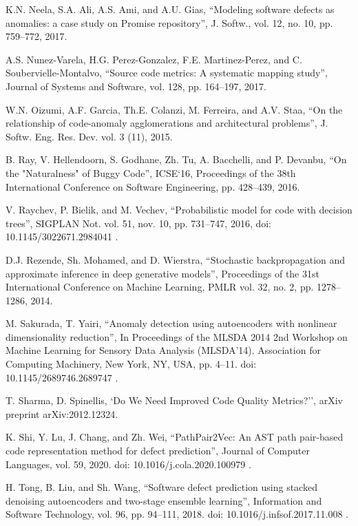 \documentclass[10pt,conference]{IEEEtran}
\begin{document}
\begin{thebibliography}{00}
 K.N. Neela, S.A. Ali, A.S. Ami, and A.U. Gias,
 ``Modeling software defects as anomalies: a case study on Promise repository'',
 J. Softw., vol. 12, no. 10, pp. 759--772, 2017.

A.S. Nunez-Varela, H.G. Perez-Gonzalez, F.E. Martinez-Perez, and C. Soubervielle-Montalvo,
 ``Source code metrics: A systematic mapping study'',
 Journal of Systems and Software, vol. 128, pp. 164--197, 2017.

W.N. Oizumi, A.F. Garcia, Th.E. Colanzi, M. Ferreira, and A.V. Staa,
 ``On the relationship of code-anomaly agglomerations and architectural problems'', 
J. Softw. Eng. Res. Dev. vol. 3 (11), 2015.

B. Ray, V. Hellendoorn, S. Godhane, Zh. Tu, A. Bacchelli, and P. Devanbu,
 ``On the "Naturalness" of Buggy Code'',
ICSE`16, Proceedings of the 38th International Conference on Software Engineering, pp. 428--439, 2016.

V. Raychev, P. Bielik, and M. Vechev,
 ``Probabilistic model for code with decision trees'',
 SIGPLAN Not. vol. 51, nov. 10, pp. 731--747, 2016, doi: 10.1145/3022671.2984041 .

 D.J. Rezende, Sh. Mohamed, and D. Wierstra,
 ``Stochastic backpropagation and approximate inference in deep generative models'',
  Proceedings of the 31st International Conference on Machine Learning, PMLR vol. 32, no. 2, pp. 1278--1286, 2014. 

 M. Sakurada, T. Yairi,
 ``Anomaly detection using autoencoders with nonlinear dimensionality reduction'',
 In Proceedings of the MLSDA 2014 2nd Workshop on Machine Learning for Sensory Data Analysis (MLSDA'14).
 Association for Computing Machinery, New York, NY, USA, pp. 4--11. doi: 10.1145/2689746.2689747 .

T. Sharma, D. Spinellis,
`Do We Need Improved Code Quality Metrics?'',
 arXiv preprint arXiv:2012.12324.

 K. Shi, Y. Lu, J. Chang, and Zh. Wei,
 ``PathPair2Vec: An AST path pair-based code representation method for defect prediction'',
 Journal of Computer Languages, vol. 59, 2020. doi: 10.1016/j.cola.2020.100979 .

 H. Tong, B. Liu, and Sh. Wang,
 ``Software defect prediction using stacked denoising autoencoders and two-stage ensemble learning'',
 Information and Software Technology, vol. 96, pp. 94--111, 2018. doi: 10.1016/j.infsof.2017.11.008 .


\end{thebibliography}
\end{document}
